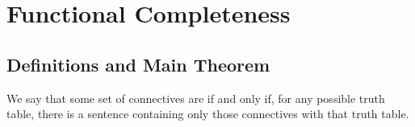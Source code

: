 %
%
%
\chapter{Functional Completeness}
\label{FuncComp} %

\section{ Definitions and Main Theorem}

\begin{definition}
    We say that some set of connectives are  if and only if, for any possible truth table, there is a sentence containing only those connectives with that truth table.
\end{definition}

